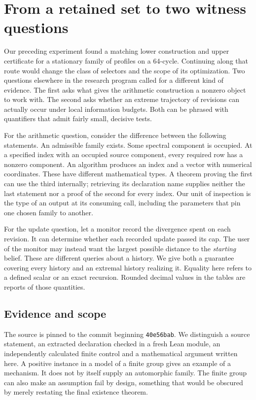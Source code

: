 \documentclass[12pt,letterpaper]{article}
\begin{document}
\section{From a retained set to two witness questions}
Our preceding experiment found a matching lower construction and upper certificate for a stationary family of profiles on a 64-cycle. Continuing along that route would change the class of selectors and the scope of its optimization. Two questions elsewhere in the research program called for a different kind of evidence. The first asks what gives the arithmetic construction a nonzero object to work with. The second asks whether an extreme trajectory of revisions can actually occur under local information budgets. Both can be phrased with quantifiers that admit fairly small, decisive tests.

For the arithmetic question, consider the difference between the following statements. An admissible family exists. Some spectral component is occupied. At a specified index with an occupied source component, every required row has a nonzero component. An algorithm produces an index and a vector with numerical coordinates. These have different mathematical types. A theorem proving the first can use the third internally; retrieving its declaration name supplies neither the last statement nor a proof of the second for every index. Our unit of inspection is the type of an output at its consuming call, including the parameters that pin one chosen family to another.

For the update question, let a monitor record the divergence spent on each revision. It can determine whether each recorded update passed its cap. The user of the monitor may instead want the largest possible distance to the \emph{starting} belief. These are different queries about a history. We give both a guarantee covering every history and an extremal history realizing it. Equality here refers to a defined scalar or an exact recursion. Rounded decimal values in the tables are reports of those quantities.

\subsection{Evidence and scope}
The source is pinned to the commit beginning \texttt{40e56bab}. We distinguish a source statement, an extracted declaration checked in a fresh Lean module, an independently calculated finite control and a mathematical argument written here. A positive instance in a model of a finite group gives an example of a mechanism. It does not by itself supply an automorphic family. The finite group can also make an assumption fail by design, something that would be obscured by merely restating the final existence theorem.
\end{document}
